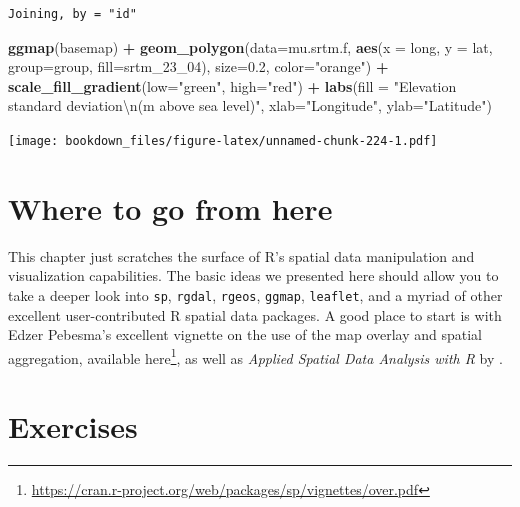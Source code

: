 \documentclass[
]{krantz}
\makeatletter
\newenvironment{Shaded}{\begin{snugshade}}{\end{snugshade}}
\newcommand{\CharTok}[1]{\textcolor[rgb]{0.5,0.5,0.5}{#1}}
\newcommand{\DataTypeTok}[1]{\textcolor[rgb]{0.27,0.27,0.27}{#1}}
\newcommand{\DecValTok}[1]{\textcolor[rgb]{0.06,0.06,0.06}{#1}}
\newcommand{\FloatTok}[1]{\textcolor[rgb]{0.06,0.06,0.06}{#1}}
\newcommand{\KeywordTok}[1]{\textcolor[rgb]{0.27,0.27,0.27}{\textbf{#1}}}
\newcommand{\NormalTok}[1]{#1}
\newcommand{\OperatorTok}[1]{\textcolor[rgb]{0.43,0.43,0.43}{\textbf{#1}}}
\newcommand{\StringTok}[1]{\textcolor[rgb]{0.5,0.5,0.5}{#1}}
\renewcommand{\href}[2]{#2\footnote{\url{#1}}}
\newenvironment{kframe}{%
\medskip{}
\setlength{\fboxsep}{.8em}
 \def\at@end@of@kframe{}%
 \ifinner\ifhmode%
  \def\at@end@of@kframe{\end{minipage}}%
  \begin{minipage}{\columnwidth}%
 \fi\fi%
 \def\FrameCommand##1{\hskip\@totalleftmargin \hskip-\fboxsep
 \colorbox{shadecolor}{##1}\hskip-\fboxsep
     \hskip-\linewidth \hskip-\@totalleftmargin \hskip\columnwidth}%
 \MakeFramed {\advance\hsize-\width
   \@totalleftmargin\z@ \linewidth\hsize
   \@setminipage}}%
 {\par\unskip\endMakeFramed%
 \at@end@of@kframe}
\renewenvironment{Shaded}{\begin{kframe}}{\end{kframe}}
\makeatother
\begin{document}
\begin{verbatim}
Joining, by = "id"
\end{verbatim}

\begin{Shaded}
\begin{Highlighting}[]
\KeywordTok{ggmap}\NormalTok{(basemap) }\OperatorTok{+}
\StringTok{    }\KeywordTok{geom\_polygon}\NormalTok{(}\DataTypeTok{data=}\NormalTok{mu.srtm.f, }\KeywordTok{aes}\NormalTok{(}\DataTypeTok{x =}\NormalTok{ long, }\DataTypeTok{y =}\NormalTok{ lat, }\DataTypeTok{group=}\NormalTok{group, }
                                     \DataTypeTok{fill=}\NormalTok{srtm\_}\DecValTok{23}\NormalTok{\_}\DecValTok{04}\NormalTok{), }
                 \DataTypeTok{size=}\FloatTok{0.2}\NormalTok{, }\DataTypeTok{color=}\StringTok{"orange"}\NormalTok{) }\OperatorTok{+}
\StringTok{    }\KeywordTok{scale\_fill\_gradient}\NormalTok{(}\DataTypeTok{low=}\StringTok{"green"}\NormalTok{, }\DataTypeTok{high=}\StringTok{"red"}\NormalTok{) }\OperatorTok{+}
\StringTok{        }\KeywordTok{labs}\NormalTok{(}\DataTypeTok{fill =} \StringTok{"Elevation standard deviation}\CharTok{\textbackslash{}n}\StringTok{(m above sea level)"}\NormalTok{, }
         \DataTypeTok{xlab=}\StringTok{"Longitude"}\NormalTok{, }\DataTypeTok{ylab=}\StringTok{"Latitude"}\NormalTok{)}
\end{Highlighting}
\end{Shaded}

\texttt{[image: bookdown\_files/figure-latex/unnamed-chunk-224-1.pdf]}

\hypertarget{where-to-go-from-here}{%
\section{Where to go from here}\label{where-to-go-from-here}}

This chapter just scratches the surface of R's spatial data manipulation and visualization capabilities. The basic ideas we presented here should allow you to take a deeper look into \texttt{sp}, \texttt{rgdal}, \texttt{rgeos}, \texttt{ggmap}, \texttt{leaflet}, and a myriad of other excellent user-contributed R spatial data packages. A good place to start is with Edzer Pebesma's excellent vignette on the use of the map overlay and spatial aggregation, available \href{https://cran.r-project.org/web/packages/sp/vignettes/over.pdf}{here}, as well as \emph{Applied Spatial Data Analysis with R} by \cite{Bivand13}.

\hypertarget{spEx}{%
\section{Exercises}\label{spEx}}
\end{document}
